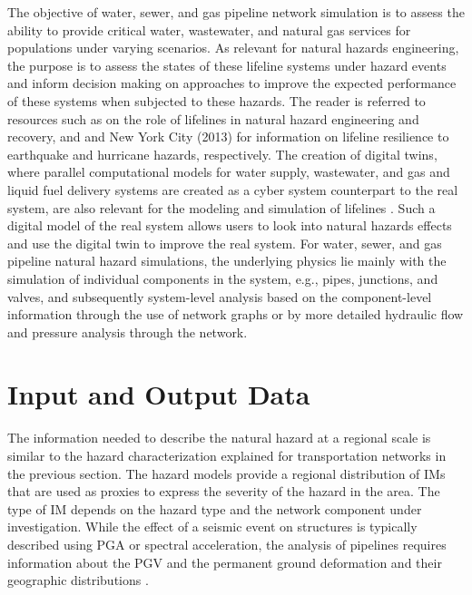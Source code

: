 The objective of water, sewer, and gas pipeline network simulation is to assess the ability to provide critical water, wastewater, and natural gas services for populations under varying scenarios. As relevant for natural hazards engineering, the purpose is to assess the states of these lifeline systems under hazard events and inform decision making on approaches to improve the expected performance of these systems when subjected to these hazards. The reader is referred to resources such as \cite{johnson2016critical} on the role of lifelines in natural hazard engineering and recovery, and \cite{orourke2014earthquakeresilient} and New York City (2013) for information on lifeline resilience to earthquake and hurricane hazards, respectively. The creation of digital twins, where parallel computational models for water supply, wastewater, and gas and liquid fuel delivery systems are created as a cyber system counterpart to the real system, are also relevant for the modeling and simulation of lifelines \citep{orourke2010geohazards, fan2019disaster}. Such a digital model of the real system allows users to look into natural hazards effects and use the digital twin to improve the real system. For water, sewer, and gas pipeline natural hazard simulations, the underlying physics lie mainly with the simulation of individual components in the system, e.g., pipes, junctions, and valves, and subsequently system-level analysis based on the component-level information through the use of network graphs or by more detailed hydraulic flow and pressure analysis through the network.
 
\section{Input and Output Data}
\label{sec:perf_pipeline_io}

The information needed to describe the natural hazard at a regional scale is similar to the hazard characterization explained for transportation networks in the previous section. The hazard models provide a regional distribution of IMs that are used as proxies to express the severity of the hazard in the area. The type of IM depends on the hazard type and the network component under investigation. While the effect of a seismic event on structures is typically described using PGA or spectral acceleration, the analysis of pipelines requires information about the PGV and the permanent ground deformation and their geographic distributions \citep{romero2010seismic}.

